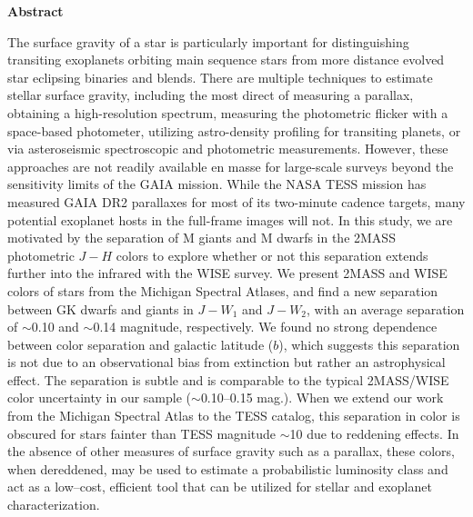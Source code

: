 {}
\vspace*{\fill}
\begin{center}
\textbf{Abstract}

The surface gravity of a star is particularly important for distinguishing transiting exoplanets orbiting main sequence stars from more distance evolved star eclipsing binaries and blends. There are multiple techniques to estimate stellar surface gravity, including the most direct of measuring a parallax, obtaining a high-resolution spectrum, measuring the photometric flicker with a space-based photometer, utilizing astro-density profiling for transiting planets, or via asteroseismic spectroscopic and photometric measurements. However, these approaches are not readily available en masse for large-scale surveys beyond the sensitivity limits of the GAIA mission. While the NASA TESS mission has measured GAIA DR2 parallaxes for most of its two-minute cadence targets, many potential exoplanet hosts in the full-frame images will not.  In this study, we are motivated by the separation of M giants and M dwarfs in the 2MASS photometric $J-H$ colors to explore whether or not this separation extends further into the infrared with the WISE survey. We present 2MASS and WISE colors of \bincount stars from the Michigan Spectral Atlases, and find a new separation between GK dwarfs and giants in $J-W_{1}$ and $J-W_{2}$, with an average separation of $\sim$0.10 and $\sim$0.14 magnitude, respectively. We found no strong dependence between color separation and galactic latitude ($b$), which suggests this separation is not due to an observational bias from extinction but rather an astrophysical effect. The separation is subtle and is comparable to the typical 2MASS/WISE color uncertainty in our sample ($\sim$0.10--0.15 mag.). When we extend our work from the Michigan Spectral Atlas to the TESS catalog, this separation in color is obscured for stars fainter than TESS magnitude $\sim$10 due to reddening effects. In the absence of other measures of surface gravity such as a parallax, these colors, when dereddened, may be used to estimate a probabilistic luminosity class and act as a low--cost, efficient tool that can be utilized for stellar and exoplanet characterization.

\end{center}
\vspace{\fill}
